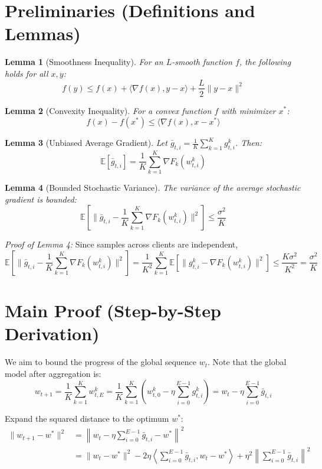 \documentclass{article}
\newtheorem{lemma}{Lemma}
\begin{document}
\newpage
\section*{Preliminaries (Definitions and Lemmas)}

\begin{lemma}[Smoothness Inequality]
For an $L$-smooth function $f$, the following holds for all $x, y$:
$$ f(y) \leq f(x) + \langle \nabla f(x), y - x \rangle + \frac{L}{2}\|y - x\|^2 $$
\end{lemma}

\begin{lemma}[Convexity Inequality]
For a convex function $f$ with minimizer $x^*$:
$$ f(x) - f(x^*) \leq \langle \nabla f(x), x - x^* \rangle $$
\end{lemma}

\begin{lemma}[Unbiased Average Gradient]
Let $\bar{g}_{t,i} = \frac{1}{K}\sum_{k=1}^K g_{t,i}^k$. Then:
$$ \mathbb{E}[\bar{g}_{t,i}] = \frac{1}{K}\sum_{k=1}^K \nabla F_k(w_{t,i}^k) $$
\end{lemma}

\begin{lemma}[Bounded Stochastic Variance]
The variance of the average stochastic gradient is bounded:
$$ \mathbb{E}[\|\bar{g}_{t,i} - \frac{1}{K}\sum_{k=1}^K \nabla F_k(w_{t,i}^k)\|^2] \leq \frac{\sigma^2}{K} $$
\end{lemma}
\textit{Proof of Lemma 4:}
Since samples across clients are independent,
$$ \mathbb{E}[\|\bar{g}_{t,i} - \frac{1}{K}\sum_{k=1}^K \nabla F_k(w_{t,i}^k)\|^2] = \frac{1}{K^2}\sum_{k=1}^K \mathbb{E}[\|g_{t,i}^k - \nabla F_k(w_{t,i}^k)\|^2] \leq \frac{K\sigma^2}{K^2} = \frac{\sigma^2}{K} $$

\section*{Main Proof (Step-by-Step Derivation)}

We aim to bound the progress of the global sequence $w_t$. Note that the global model after aggregation is:
$$ w_{t+1} = \frac{1}{K}\sum_{k=1}^K w_{t,E}^k = \frac{1}{K}\sum_{k=1}^K \left( w_{t,0}^k - \eta \sum_{i=0}^{E-1} g_{t,i}^k \right) = w_t - \eta \sum_{i=0}^{E-1} \bar{g}_{t,i} $$

Expand the squared distance to the optimum $w^*$:
\begin{align*}
\|w_{t+1} - w^*\|^2 &= \left\| w_t - \eta \sum_{i=0}^{E-1} \bar{g}_{t,i} - w^* \right\|^2 \\
&= \|w_t - w^*\|^2 - 2\eta \left\langle \sum_{i=0}^{E-1} \bar{g}_{t,i}, w_t - w^* \right\rangle + \eta^2 \left\| \sum_{i=0}^{E-1} \bar{g}_{t,i} \right\|^2
\end{align*}
\end{document}
